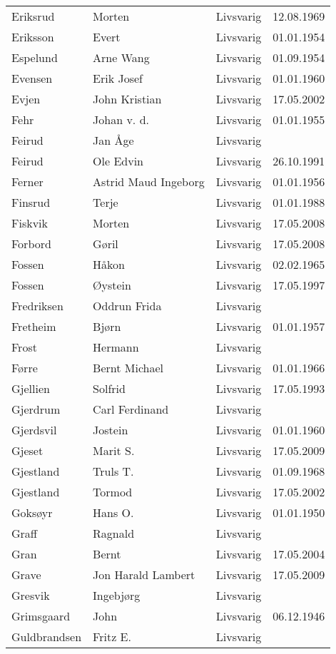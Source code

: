 \begin{longtable}{llll}
Eriksrud	&	Morten	&	Livsvarig 	&	12.08.1969	\\
Eriksson	&	Evert	&	Livsvarig 	&	01.01.1954	\\
Espelund	&	Arne Wang	&	Livsvarig 	&	01.09.1954	\\
Evensen	&	Erik Josef	&	Livsvarig 	&	01.01.1960	\\
Evjen 	&	John Kristian	&	Livsvarig	&	17.05.2002	\\
Fehr	&	Johan v. d.	&	Livsvarig 	&	01.01.1955	\\
Feirud  &	Jan Åge		&	Livsvarig	&			\\
Feirud	&	Ole Edvin	&	Livsvarig 	&	26.10.1991	\\
Ferner	&	Astrid Maud Ingeborg	&	Livsvarig 	&	01.01.1956	\\
Finsrud	&	Terje	&	Livsvarig 	&	01.01.1988	\\
Fiskvik	&	Morten	&	Livsvarig	&	17.05.2008	\\
Forbord	&	Gøril	&	Livsvarig	&	17.05.2008	\\
Fossen	&	Håkon	&	Livsvarig 	&	02.02.1965	\\
Fossen 	&	Øystein	&	Livsvarig	&	17.05.1997	\\
Fredriksen &	Oddrun Frida &	Livsvarig	&			\\
Fretheim	&	Bjørn	&	Livsvarig 	&	01.01.1957	\\
Frost	&	Hermann	&	Livsvarig 	&		\\
Førre	&	Bernt Michael	&	Livsvarig 	&	01.01.1966	\\
Gjellien	&	Solfrid	&	Livsvarig 	&	17.05.1993	\\
Gjerdrum	&	Carl Ferdinand	&	Livsvarig 	&		\\
Gjerdsvil	&	Jostein	&	Livsvarig 	&	01.01.1960	\\
Gjeset	&	Marit S.	&	Livsvarig	&	17.05.2009	\\
Gjestland	&	Truls T. 	&	Livsvarig 	&	01.09.1968	\\
Gjestland 	&	Tormod	&	Livsvarig	&	17.05.2002	\\
Goksøyr	&	Hans O.	&	Livsvarig 	&	01.01.1950	\\
Graff	&	Ragnald	&	Livsvarig 	&		\\
Gran 	&	Bernt	&	Livsvarig	&	17.05.2004	\\
Grave	&	Jon Harald Lambert	&	Livsvarig	&	17.05.2009	\\
Gresvik	&	Ingebjørg	&	Livsvarig 	&		\\
Grimsgaard	&	John	&	Livsvarig 	&	06.12.1946	\\
Guldbrandsen	&	Fritz E. 	&	Livsvarig 	&		\\

\end{longtable}
